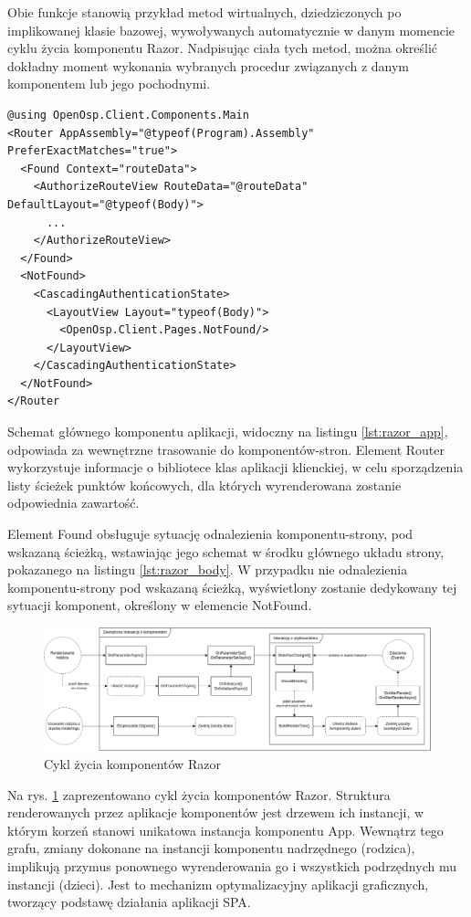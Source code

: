 Obie funkcje stanowią przykład metod wirtualnych, dziedziczonych po implikowanej klasie bazowej, wywoływanych automatycznie w danym momencie cyklu życia komponentu Razor. Nadpisując ciała tych metod, można określić dokładny moment wykonania wybranych procedur związanych z danym komponentem lub jego pochodnymi.

\begin{lstlisting}[language=CSharp, caption={Główny komponent Razor aplikacji klienckiej}, label=lst:razor_app]
@using OpenOsp.Client.Components.Main
<Router AppAssembly="@typeof(Program).Assembly" PreferExactMatches="true">
  <Found Context="routeData">
    <AuthorizeRouteView RouteData="@routeData" DefaultLayout="@typeof(Body)">
      ...
    </AuthorizeRouteView>
  </Found>
  <NotFound>
    <CascadingAuthenticationState>
      <LayoutView Layout="typeof(Body)">
        <OpenOsp.Client.Pages.NotFound/>
      </LayoutView>
    </CascadingAuthenticationState>
  </NotFound>
</Router
\end{lstlisting}

Schemat głównego komponentu aplikacji, widoczny na listingu \ref{lst:razor_app}, odpowiada za wewnętrzne trasowanie do komponentów-stron. Element Router wykorzystuje informacje o bibliotece klas aplikacji klienckiej, w celu sporządzenia listy ścieżek punktów końcowych, dla których wyrenderowana zostanie odpowiednia zawartość. 

Element Found obsługuje sytuację odnalezienia komponentu-strony, pod wskazaną ścieżką, wstawiając jego schemat w środku głównego układu strony, pokazanego na listingu \ref{lst:razor_body}. W przypadku nie odnalezienia komponentu-strony pod wskazaną ścieżką, wyświetlony zostanie dedykowany tej sytuacji komponent, określony w elemencie NotFound.

\begin{figure}[!htbp] 
    \centering
    \includegraphics[width=\textwidth]{img/chapter5/razor.lifecycle.png}
    \caption{Cykl życia komponentów Razor}
    \label{fig:razor.lifecycle}
\end{figure}

Na rys. \ref{fig:razor.lifecycle} zaprezentowano cykl życia komponentów Razor. Struktura renderowanych przez aplikacje komponentów jest drzewem ich instancji, w którym korzeń stanowi unikatowa instancja komponentu App. Wewnątrz tego grafu, zmiany dokonane na instancji komponentu nadrzędnego (rodzica), implikują przymus ponownego wyrenderowania go i wszystkich podrzędnych mu instancji (dzieci). Jest to mechanizm optymalizacyjny aplikacji graficznych, tworzący podstawę działania aplikacji SPA. 

